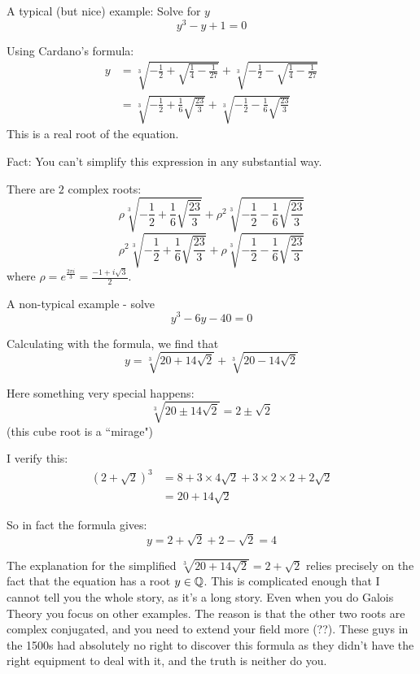 \documentclass[twoside]{scrartcl}
\begin{document}
\begin{example}
A typical (but nice) example:  Solve for $y$
\[y^3 - y + 1= 0\]	

Using Cardano's formula: 
\[
\begin{aligned}
  y &= \sqrt[3]{-\frac{1}{2} + \sqrt{\frac{1}{4}- \frac{1}{27}}} +\sqrt[3]{-\frac{1}{2} - \sqrt{\frac{1}{4}- \frac{1}{27}}}\\
  &= \sqrt[3]{-\frac{1}{2} + \frac{1}{6}\sqrt{\frac{23}{3}}} + \sqrt[3]{-\frac{1}{2} - \frac{1}{6}\sqrt{\frac{23}{3}}} 
\end{aligned}
\]
This is a real root of the equation. 

Fact: You can't simplify this expression in any substantial way. 

There are $2$ complex roots: 
\[\rho\sqrt[3]{-\frac{1}{2} + \frac{1}{6}\sqrt{\frac{23}{3}}} + \rho^2\sqrt[3]{-\frac{1}{2} - \frac{1}{6}\sqrt{\frac{23}{3}}} \]
\[\rho^2\sqrt[3]{-\frac{1}{2} + \frac{1}{6}\sqrt{\frac{23}{3}}} + \rho\sqrt[3]{-\frac{1}{2} - \frac{1}{6}\sqrt{\frac{23}{3}}} \]
where $\rho = e^{\frac{2\pi i}{3}} = \frac{-1 + i\sqrt{3}}{2}$. 
\end{example}\vspace*{10pt}

\begin{example}
A non-typical example - solve
\[y^3 - 6y - 40 = 0\]	

Calculating with the formula, we find that 
\[y = \sqrt[3]{20 + 14\sqrt{2}} + \sqrt[3]{20 - 14\sqrt{2}}\]

Here something very special happens:
\[\sqrt[3]{20\pm 14\sqrt{2}} = 2 \pm \sqrt{2}\] 
(this cube root is a ``mirage")

I verify this: 
\[
\begin{aligned}
  (2 + \sqrt{2})^3 &= 8 + 3\times 4\sqrt{2} + 3 \times 2 \times 2 + 2\sqrt{2}\\
  &= 20 + 14\sqrt{2}
\end{aligned}
\]

So in fact the formula gives: 
\[y = 2 + \sqrt{2} + 2 - \sqrt{2} = 4\]

The explanation for the simplified $\sqrt[3]{20 + 14\sqrt{2}} = 2 + \sqrt{2}$ relies precisely on the fact that the equation has a root $y \in\mathbb{Q}$. This is complicated enough that I cannot tell you the whole story, as it's a long story. Even when you do Galois Theory you focus on other examples. The reason is that the other two roots are complex conjugated, and you need to extend your field more (??). These guys in the 1500s had absolutely no right to discover this formula as they didn't have the right equipment to deal with it, and the truth is neither do you.  
\end{example}\vspace*{10pt}
\end{document}
